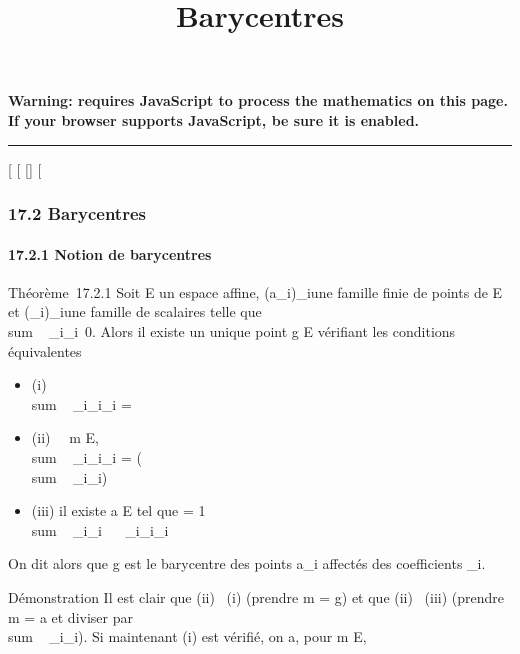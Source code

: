 \documentclass[]{article}
\title{Barycentres}
\author{}
\date{}
\begin{document}
\maketitle

\textbf{Warning: 
requires JavaScript to process the mathematics on this page.\\ If your
browser supports JavaScript, be sure it is enabled.}

\begin{center}\rule{3in}{0.4pt}\end{center}

[
[
[]
[

\subsubsection{17.2 Barycentres}

\paragraph{17.2.1 Notion de barycentres}

Théorème~17.2.1 Soit E un espace affine, (a_i)_i\inI une
famille finie de points de E et (\lambda_i)_i\inI une famille
de scalaires telle que
\\sum ~
_i\inI\lambda_i\neq~0. Alors il existe un
unique point g \in E vérifiant les conditions équivalentes

\begin{itemize}
\itemsep1pt\parskip0pt
\item
  (i) \\sum ~
  _i\inI\lambda_i\overrightarrowga_i
  =
\item
  (ii) \forall~~m \in E,
  \\sum ~
  _i\inI\lambda_i\overrightarrowma_i
  = (\\sum ~
  _i\inI\lambda_i)\overrightarrowmg
\item
  (iii) il existe a \in E tel que \overrightarrowag =
  1 \over
  \\sum ~
  _i\inI\lambda_i \
  \sum ~
  _i\inI\lambda_i\overrightarrowaa_i
\end{itemize}

On dit alors que g est le barycentre des points a_i affectés
des coefficients \lambda_i.

Démonstration Il est clair que (ii) \rigtharrow~(i) (prendre m = g) et que (ii)
\rigtharrow~(iii) (prendre m = a et diviser par
\\sum ~
_i\inI\lambda_i). Si maintenant (i) est vérifié, on a, pour m \in
E,
\end{document}
